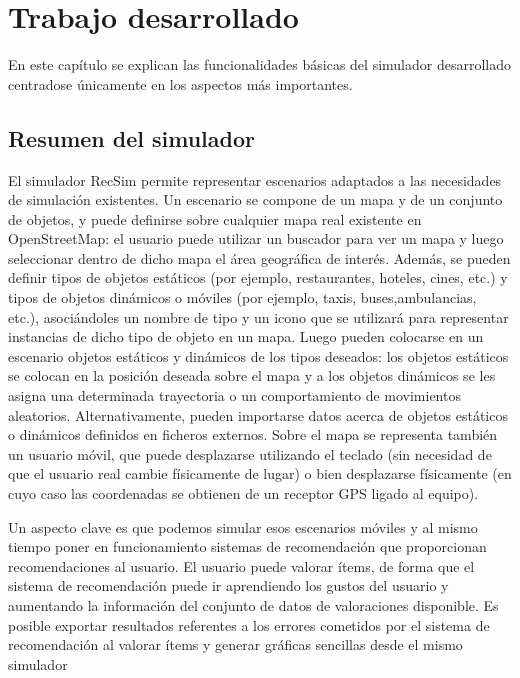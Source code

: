 \chapter{Trabajo desarrollado}


En este capítulo se explican las funcionalidades básicas del simulador desarrollado centradose únicamente en los aspectos más importantes.

\section{Resumen del simulador}

El simulador RecSim permite representar escenarios adaptados a las necesidades de simulación existentes. Un escenario se compone de un mapa y de un conjunto de objetos, y puede definirse sobre cualquier mapa real existente en OpenStreetMap: el usuario puede utilizar un buscador para ver un mapa y luego seleccionar dentro de dicho mapa el área geográfica de interés. Además, se pueden definir tipos de objetos estáticos (por ejemplo, restaurantes, hoteles, cines, etc.) y tipos de objetos dinámicos o móviles (por ejemplo, taxis, buses,ambulancias, etc.), asociándoles un nombre de tipo y un icono que se utilizará para representar instancias de dicho tipo de objeto en un mapa. Luego pueden colocarse en un escenario objetos estáticos y dinámicos de los tipos deseados: los objetos estáticos se colocan en la posición deseada sobre el mapa y a los objetos dinámicos se les asigna una determinada trayectoria o un comportamiento de movimientos aleatorios. Alternativamente, pueden importarse datos acerca de objetos estáticos o dinámicos definidos en ficheros externos. Sobre el mapa se representa también un usuario móvil, que puede desplazarse utilizando el teclado (sin necesidad de que el usuario real cambie físicamente de lugar) o bien desplazarse físicamente (en cuyo caso las coordenadas se obtienen de un receptor GPS ligado al equipo).

Un aspecto clave es que podemos simular esos escenarios móviles y al mismo tiempo poner en funcionamiento sistemas de recomendación que proporcionan recomendaciones al usuario. El usuario puede valorar ítems, de forma que el sistema de recomendación puede ir aprendiendo los gustos del usuario y aumentando la información del conjunto de datos de valoraciones disponible. Es posible exportar resultados referentes a los errores cometidos por el sistema de recomendación al valorar ítems y generar gráficas sencillas desde el mismo simulador

